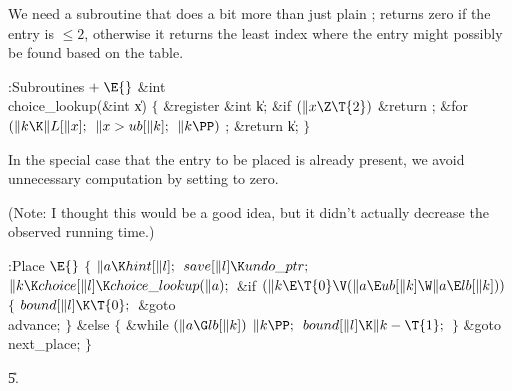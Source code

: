 We need a subroutine that does a bit more than just
plain ;
 returns zero if the entry is $\le2$, otherwise it
returns the least index where the entry might possibly be found
based on the  table.

\Y\B\4:Subroutines\X${}\mathrel+\E{}$\6
\&{int} \\{choice\_lookup}(\&{int} \|x)\6
${}\{{}$\1\6
\&{register} \&{int} \|k;\7
\&{if} ${}(\|x\Z\T{2}){}$\1\5
\&{return} ;\2\6
\&{for} ${}(\|k\K\|L[\|x];{}$ ${}\|x>\\{ub}[\|k];{}$ ${}\|k\PP){}$\1\5
;\2\6
\&{return} \|k;\6
\4${}\}{}$\2\par
\fi

In the special case that the entry to be placed is
already present,
we avoid unnecessary computation by setting  to zero.

(Note: I thought this would be a good idea, but it didn't actually
decrease the observed running time.)

\Y\B\4:Place \X${}\E{}$\6
${}\{{}$\1\6
${}\|a\K\\{hint}[\|l];{}$\6
${}\\{save}[\|l]\K\\{undo\_ptr};{}$\6
${}\|k\K\\{choice}[\|l]\K\\{choice\_lookup}(\|a);{}$\6
\&{if} ${}(\|k\E\T{0}\V(\|a\E\\{ub}[\|k]\W\|a\E\\{lb}[\|k])){}$\5
${}\{{}$\1\6
${}\\{bound}[\|l]\K\T{0};{}$\6
\&{goto} \\{advance};\6
\4${}\}{}$\2\6
\&{else}\5
${}\{{}$\1\6
\&{while} ${}(\|a\G\\{lb}[\|k]){}$\1\5
${}\|k\PP;{}$\2\6
${}\\{bound}[\|l]\K\|k-\T{1};{}$\6
\4${}\}{}$\2\6
\&{goto} \\{next\_place};\6
\4${}\}{}$\2\par
\U5.\fi

